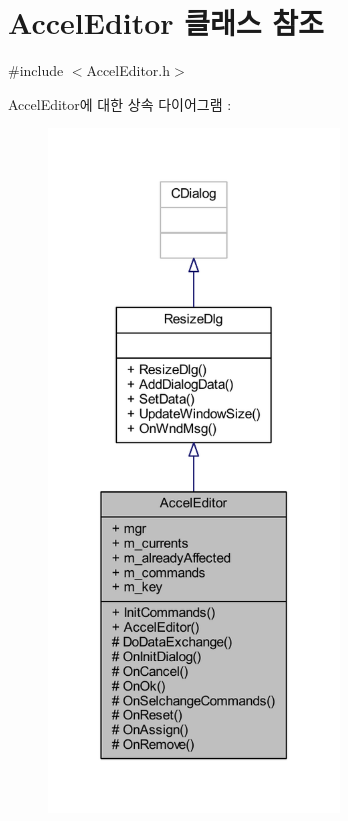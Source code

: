 \hypertarget{class_accel_editor}{}\section{Accel\+Editor 클래스 참조}
\label{class_accel_editor}


{\ttfamily \#include $<$Accel\+Editor.\+h$>$}



Accel\+Editor에 대한 상속 다이어그램 \+: \nopagebreak
\begin{figure}[H]
\begin{center}
\leavevmode
\includegraphics[width=219pt]{class_accel_editor__inherit__graph}
\end{center}
\end{figure}


